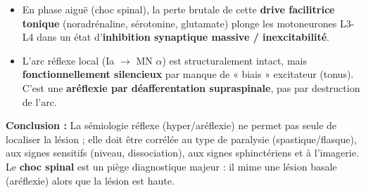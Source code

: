 \documentclass[11pt]{article}
\begin{document}
\begin{exoresolu}
\begin{enumerate}
\begin{itemize}
        \item En phase aiguë (choc spinal), la perte brutale de cette \textbf{drive facilitrice tonique} (noradrénaline, sérotonine, glutamate) plonge les motoneurones L3-L4 dans un état d'\textbf{inhibition synaptique massive / inexcitabilité}.
        \item L'arc réflexe local (Ia $\rightarrow$ MN $\alpha$) est structuralement intact, mais \textbf{fonctionnellement silencieux} par manque de « biais » excitateur (tonus). C'est une \textbf{aréflexie par déafferentation supraspinale}, pas par destruction de l'arc.
    \end{itemize}
\end{enumerate}
\textbf{Conclusion :} La sémiologie réflexe (hyper/aréflexie) ne permet pas seule de localiser la lésion ; elle doit être corrélée au type de paralysie (spastique/flasque), aux signes sensitifs (niveau, dissociation), aux signes sphinctériens et à l'imagerie. Le \textbf{choc spinal} est un piège diagnostique majeur : il mime une lésion basale (aréflexie) alors que la lésion est haute.
\end{exoresolu}
\end{document}
